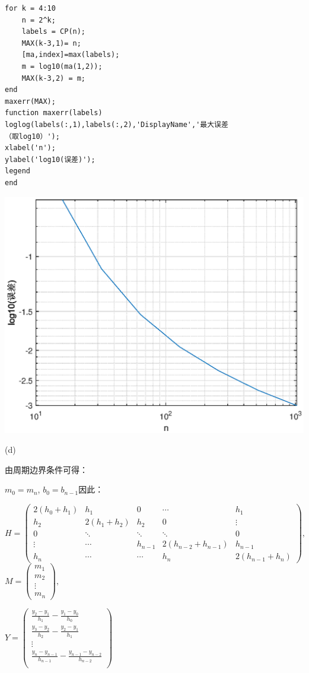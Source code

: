 \documentclass[12pt,a4paper,UTF8]{ctexart}
\begin{document}
\begin{enumerate}
\begin{lstlisting}[frame=single]
for k = 4:10
    n = 2^k;
    labels = CP(n);
    MAX(k-3,1)= n;
    [ma,index]=max(labels);
    m = log10(ma(1,2));
    MAX(k-3,2) = m;
end
maxerr(MAX);
function maxerr(labels)
loglog(labels(:,1),labels(:,2),'DisplayName','最大误差
（取log10）');
xlabel('n');
ylabel('log10(误差)');
legend
end
\end{lstlisting}
\begin{center}
\includegraphics[scale=1]{1c.eps}
\end{center}

(d)

由周期边界条件可得：

\qquad $m_0 = m_n$, $b_0 = b_{n-1}$因此：

$H = 
\begin{pmatrix}
    2(h_0+h_1) & h_1 & 0 & \cdots & h_1\\
    h_2 & 2(h_1+h_2) & h_2 & 0 & \vdots\\
    0 & \ddots & \ddots & \ddots & 0\\
    \vdots & \cdots & h_{n-1} & 2(h_{n-2}+h_{n-1}) & h_{n-1}\\
    h_n  & \cdots & \cdots & h_{n} & 2(h_{n-1}+h_{n}) 
\end{pmatrix},$
$M = 
\begin{pmatrix}
m_1\\
m_2\\
\vdots\\
m_n
\end{pmatrix},$

$Y = 
\begin{pmatrix}
\frac{y_2-y_1}{h_1}-\frac{y_1-y_0}{h_0}\\
\frac{y_3-y_2}{h_2}-\frac{y_2-y_1}{h_1}\\
\vdots\\
\frac{y_{n}-y_{n-1}}{h_{n-1}}-\frac{y_{n-1}-y_{n-2}}{h_{n-2}}\\
\end{pmatrix}$


\end{enumerate}
\end{document}
